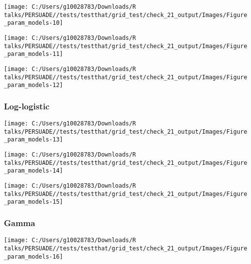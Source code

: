 \documentclass[
]{article}
\begin{document}
\begin{flushleft}\texttt{[image: C:/Users/g10028783/Downloads/R talks/PERSUADE//tests/testthat/grid\_test/check\_21\_output/Images/Figure\_param\_models-10]} \end{flushleft}

\begin{flushleft}\texttt{[image: C:/Users/g10028783/Downloads/R talks/PERSUADE//tests/testthat/grid\_test/check\_21\_output/Images/Figure\_param\_models-11]} \end{flushleft}

\begin{flushleft}\texttt{[image: C:/Users/g10028783/Downloads/R talks/PERSUADE//tests/testthat/grid\_test/check\_21\_output/Images/Figure\_param\_models-12]} \end{flushleft}

\clearpage

\subsubsection{Log-logistic}\label{log-logistic}

\begin{flushleft}\texttt{[image: C:/Users/g10028783/Downloads/R talks/PERSUADE//tests/testthat/grid\_test/check\_21\_output/Images/Figure\_param\_models-13]} \end{flushleft}

\begin{flushleft}\texttt{[image: C:/Users/g10028783/Downloads/R talks/PERSUADE//tests/testthat/grid\_test/check\_21\_output/Images/Figure\_param\_models-14]} \end{flushleft}

\begin{flushleft}\texttt{[image: C:/Users/g10028783/Downloads/R talks/PERSUADE//tests/testthat/grid\_test/check\_21\_output/Images/Figure\_param\_models-15]} \end{flushleft}

\clearpage

\subsubsection{Gamma}\label{gamma}

\begin{flushleft}\texttt{[image: C:/Users/g10028783/Downloads/R talks/PERSUADE//tests/testthat/grid\_test/check\_21\_output/Images/Figure\_param\_models-16]} \end{flushleft}
\end{document}

